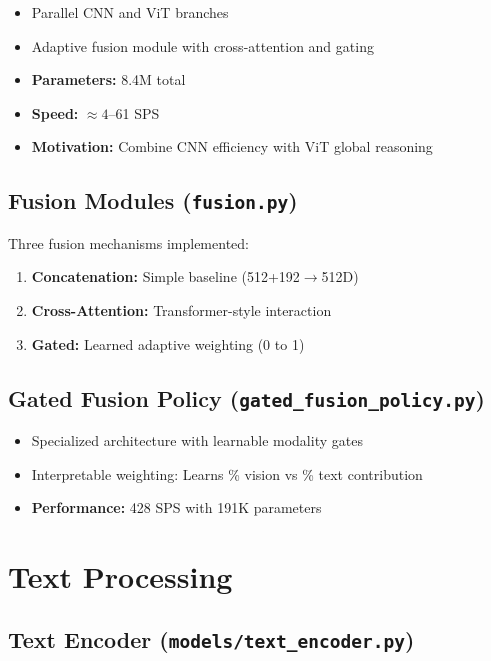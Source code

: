 \documentclass[12pt,a4paper,openany]{report}
\begin{document}
\begin{itemize}
    \item Parallel CNN and ViT branches
    \item Adaptive fusion module with cross-attention and gating
    \item \textbf{Parameters:} 8.4M total
    \item \textbf{Speed:} $\approx 4$--61 SPS
    \item \textbf{Motivation:} Combine CNN efficiency with ViT global reasoning
\end{itemize}

\subsection{Fusion Modules (\texttt{fusion.py})}

Three fusion mechanisms implemented:

\begin{enumerate}
    \item \textbf{Concatenation:} Simple baseline (512+192$\to$512D)
    \item \textbf{Cross-Attention:} Transformer-style interaction
    \item \textbf{Gated:} Learned adaptive weighting (0 to 1)
\end{enumerate}

\subsection{Gated Fusion Policy (\texttt{gated\_fusion\_policy.py})}

\begin{itemize}
    \item Specialized architecture with learnable modality gates
    \item Interpretable weighting: Learns \% vision vs \% text contribution
    \item \textbf{Performance:} 428 SPS with 191K parameters
\end{itemize}

\section{Text Processing}

\subsection{Text Encoder (\texttt{models/text\_encoder.py})}
\end{document}
